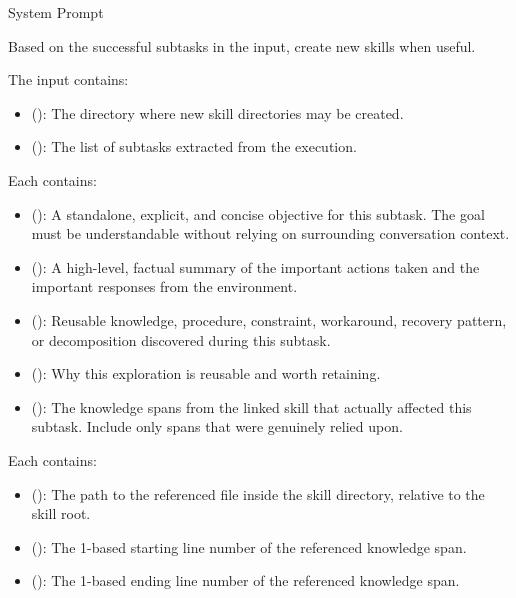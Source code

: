 \begin{svpromptbox}{System Prompt}

\smallskip
Based on the successful subtasks in the input, create new skills when useful.\par
\smallskip
{}
\smallskip
The input contains:\par
\smallskip
\begin{itemize}
\item {} (): The directory where new skill directories may be created.
\item {} (): The list of subtasks extracted from the execution.
\end{itemize}
\smallskip
Each  contains:\par
\smallskip
\begin{itemize}
\item {} (): A standalone, explicit, and concise objective for this subtask. The goal must be understandable without relying on surrounding conversation context.
\item {} (): A high-level, factual summary of the important actions taken and the important responses from the environment.
\item {} (): Reusable knowledge, procedure, constraint, workaround, recovery pattern, or decomposition discovered during this subtask.
\item {} (): Why this exploration is reusable and worth retaining.
\item {} (): The knowledge spans from the linked skill that actually affected this subtask. Include only spans that were genuinely relied upon.
\end{itemize}
\smallskip
Each  contains:\par
\smallskip
\begin{itemize}
\item {} (): The path to the referenced file inside the skill directory, relative to the skill root.
\item {} (): The 1-based starting line number of the referenced knowledge span.
\item {} (): The 1-based ending line number of the referenced knowledge span.

\end{itemize}
\end{svpromptbox}
